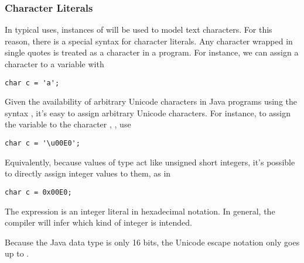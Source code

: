 \subsubsection{Character Literals}\label{section:character-literals}

In typical uses, instances of  will be used to model text
characters.  For this reason, there is a special syntax for character
literals.  Any character wrapped in single quotes is treated as
a character in a program.  For instance, we can assign a character
to a variable with 
%
\begin{verbatim}
char c = 'a'; 
\end{verbatim}
%
Given the availability of arbitrary Unicode characters in Java
programs using the syntax , it's easy
to assign arbitrary Unicode characters.  For instance, 
to assign the variable  to the character ,
, use
%
\begin{verbatim}
char c = '\u00E0'; 
\end{verbatim}
%
Equivalently, because values of type  act like unsigned
short integers, it's possible to directly assign integer values
to them, as in
%
\begin{verbatim}
char c = 0x00E0;
\end{verbatim}
%
The expression  is an integer literal in hexadecimal
notation.  In general, the compiler will infer which kind of integer
is intended.  

Because the Java  data type is only 16 bits, the Unicode
escape notation only goes up to .

